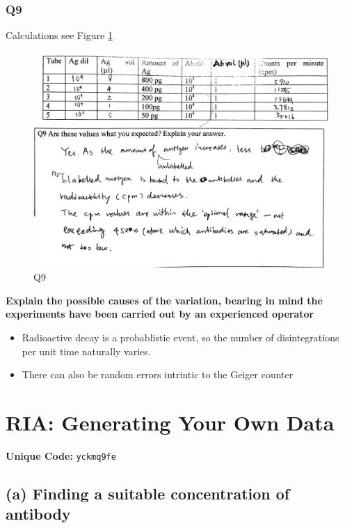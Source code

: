 \documentclass[
]{article}
\providecommand{\tightlist}{%
  \setlength{\itemsep}{0pt}\setlength{\parskip}{0pt}}
\begin{document}
\hypertarget{q9}{%
\subsubsection*{Q9}\label{q9}}

Calculations see Figure \ref{fig:immunolab-q9}

\begin{figure}
\includegraphics[width=1\linewidth]{../img/immunolab-q9} \caption{Q9}\label{fig:immunolab-q9}
\end{figure}

\textbf{Explain the possible causes of the variation, bearing in mind the experiments have been carried out by an experienced operator}

\begin{itemize}
\tightlist
\item
  Radioactive decay is a probablistic event, so the number of disintegrations per unit time naturally varies.
\item
  There can also be random errors intrintic to the Geiger counter
\end{itemize}

\hypertarget{ria-generating-your-own-data}{%
\section{RIA: Generating Your Own Data}\label{ria-generating-your-own-data}}

\textbf{Unique Code:} \texttt{yckmq9fe}

\hypertarget{a-finding-a-suitable-concentration-of-antibody}{%
\subsection*{(a) Finding a suitable concentration of antibody}\label{a-finding-a-suitable-concentration-of-antibody}}
\end{document}
